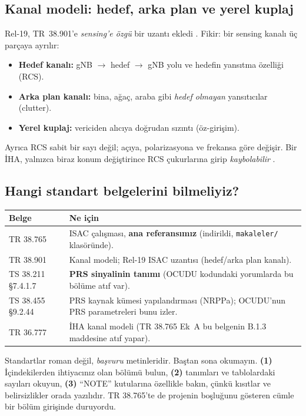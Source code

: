 \subsection{Kanal modeli: hedef, arka plan ve yerel kuplaj}

Rel-19, TR~38.901'e \emph{sensing'e özgü} bir uzantı ekledi \cite{lin,liu19}. Fikir: bir sensing kanalı üç parçaya ayrılır:
\begin{itemize}
\item \textbf{Hedef kanalı:} gNB $\rightarrow$ hedef $\rightarrow$ gNB yolu ve hedefin yansıtma özelliği (RCS).
\item \textbf{Arka plan kanalı:} bina, ağaç, araba gibi \emph{hedef olmayan} yansıtıcılar (clutter).
\item \textbf{Yerel kuplaj:} vericiden alıcıya doğrudan sızıntı (öz-girişim).
\end{itemize}
Ayrıca RCS sabit bir sayı değil; açıya, polarizasyona ve frekansa göre değişir. Bir İHA, yalnızca biraz konum değiştirince RCS çukurlarına girip \emph{kaybolabilir} \cite{lin}.

\subsection{Hangi standart belgelerini bilmeliyiz?}

\begingroup\sffamily\small
\begin{xltabular}{\textwidth}{@{}p{2.7cm}X@{}}
\toprule
\textbf{Belge} & \textbf{Ne için} \\
\midrule
TR 38.765 & ISAC çalışması, \textbf{ana referansımız} (indirildi, \texttt{makaleler/} klasöründe). \\
TR 38.901 & Kanal modeli; Rel-19 ISAC uzantısı (hedef/arka plan kanalı). \\
TS 38.211 \S7.4.1.7 & \textbf{PRS sinyalinin tanımı} (OCUDU kodundaki yorumlarda bu bölüme atıf var). \\
TS 38.455 \S9.2.44 & PRS kaynak kümesi yapılandırması (NRPPa); OCUDU'nun PRS parametreleri bunu izler. \\
TR 36.777 & İHA kanal modeli (TR 38.765 Ek~A bu belgenin B.1.3 maddesine atıf yapar). \\
\bottomrule
\end{xltabular}
\endgroup

\begin{ipucu}
Standartlar roman değil, \emph{başvuru} metinleridir. Baştan sona okumayın. \textbf{(1)} İçindekilerden ihtiyacınız olan bölümü bulun, \textbf{(2)} tanımları ve tablolardaki sayıları okuyun,
\textbf{(3)} ``NOTE'' kutularına özellikle bakın, çünkü kısıtlar ve belirsizlikler orada yazılıdır. TR 38.765'te de projenin boşluğunu gösteren cümle bir bölüm girişinde duruyordu.
\end{ipucu}
